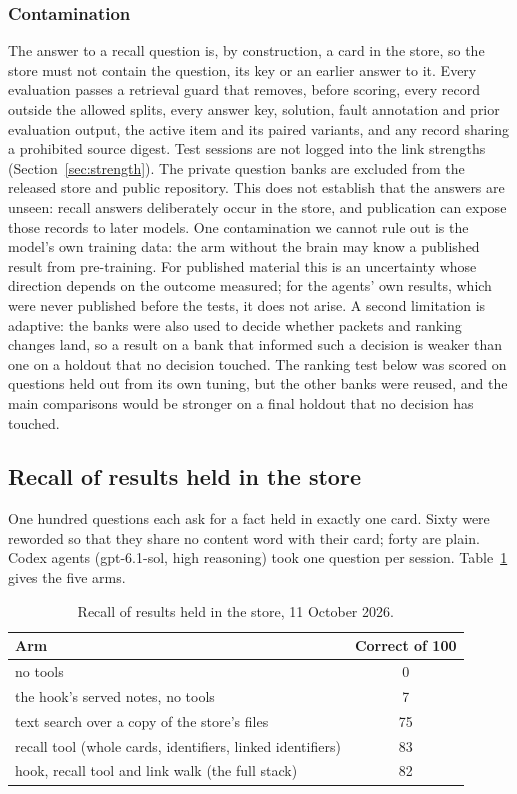 \subsubsection*{Contamination}
The answer to a recall question is, by construction, a card in the store, so the store must not contain the question, its key or an earlier answer to it. Every evaluation passes a retrieval guard that removes, before scoring, every record outside the allowed splits, every answer key, solution, fault annotation and prior evaluation output, the active item and its paired variants, and any record sharing a prohibited source digest. Test sessions are not logged into the link strengths (Section~\ref{sec:strength}). The private question banks are excluded from the released store and public repository. This does not establish that the answers are unseen: recall answers deliberately occur in the store, and publication can expose those records to later models. One contamination we cannot rule out is the model's own training data: the arm without the brain may know a published result from pre-training. For published material this is an uncertainty whose direction depends on the outcome measured; for the agents' own results, which were never published before the tests, it does not arise. A second limitation is adaptive: the banks were also used to decide whether packets and ranking changes land, so a result on a bank that informed such a decision is weaker than one on a holdout that no decision touched. The ranking test below was scored on questions held out from its own tuning, but the other banks were reused, and the main comparisons would be stronger on a final holdout that no decision has touched.



\subsection{Recall of results held in the store}
One hundred questions each ask for a fact held in exactly one card. Sixty were reworded so that they share no content word with their card; forty are plain. Codex agents (gpt-6.1-sol, high reasoning) took one question per session. Table~\ref{tab:recall100} gives the five arms.

\begin{table}[ht]
\centering\small
\begin{tabular}{lc}
\toprule
Arm & Correct of 100\\
\midrule
no tools & 0\\
the hook's served notes, no tools & 7\\
text search over a copy of the store's files & 75\\
recall tool (whole cards, identifiers, linked identifiers) & 83\\
hook, recall tool and link walk (the full stack) & 82\\
\bottomrule
\end{tabular}
\caption{Recall of results held in the store, 11 October 2026.}
\label{tab:recall100}
\end{table}

